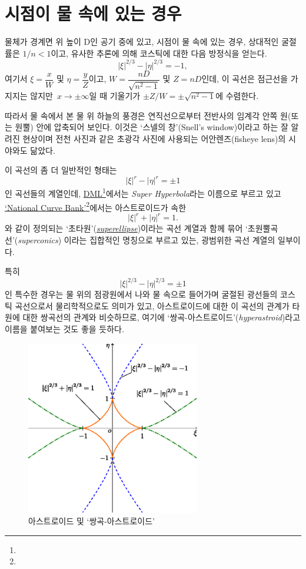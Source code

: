 \documentclass[twocolumn]{article}
\begin{document}
\section{시점이 물 속에 있는 경우}

물체가 경계면 위 높이 D인 공기 중에 있고, 
시점이 물 속에 있는 경우, 상대적인 굴절률은 $1/n < 1$이고, 
유사한 추론에 의해 코스틱에 대한 다음 방정식을 얻는다.
$$ \left| \xi \right|^{2/3} - \left| \eta \right|^{2/3} = -1, $$
여기서 $\xi = \dfrac{x}{W} $ 및 $\eta = \dfrac{y}{Z}$이고, 
$W = \dfrac{nD}{\sqrt{n^2-1}}$ 및 $Z = nD$인데,  이 곡선은 점근선을 가지지는 않지만 $x\rightarrow\pm\infty$일 때 기울기가 $\pm Z/W = \pm \sqrt{n^2-1}$에 수렴한다.

따라서 물 속에서 본 물 위 하늘의 풍경은
연직선으로부터 전반사의 임계각 안쪽 원(또는 원뿔) 안에 압축되어 보인다. 이것은 
`스넬의 창'(Snell's window)이라고 하는 잘 알려진 현상이며 전천 사진과 같은 초광각 
사진에 사용되는 어안렌즈(fisheye lens)의 시야와도 닮았다.

이 곡선의 좀 더 일반적인 형태는 
$$ \left| \xi \right|^{r} - \left| \eta \right|^{r} = \pm1 $$
인 곡선들의 계열인데, \href{http://dynamicmathematicslearning.com/super-ellipse.html}%
{DML}\footnote{}에서는 \emph{Super Hyperbola}라는 이름으로 부르고 있고 
\href{https://old.nationalcurvebank.org/superconicncb/superconicncb.htm}{`National Curve Bank'}\footnote{}에서는
아스트로이드가 속한 
$$ \left| \xi \right|^{r} + \left| \eta \right|^{r} = 1. $$
와 같이 정의되는 `초타원'(\href{https://mathworld.wolfram.com/Astroid.html}%
{\emph{superellipse}})이라는 곡선 계열과 함께 묶어
`초원뿔곡선'(\emph{superconics}) 이라는 집합적인 명칭으로 부르고 있는, 광범위한 곡선 계열의 일부이다.

특히
$$ \left| \xi \right|^{2/3} - \left| \eta \right|^{2/3} = \pm1 $$
인 특수한 경우는 물 위의 점광원에서 나와 물 속으로 들어가며 굴절된 광선들의 코스틱 곡선으로서 
물리학적으로도 의미가 있고, 아스트로이드에 대한 이 곡선의 관계가 타원에 대한 쌍곡선의 관계와 
비슷하므로, 여기에 `쌍곡-아스트로이드'(\emph{hyperastroid})라고 이름을 붙여보는 것도 좋을 듯하다. 

\begin{figure}
	\centering
	\includegraphics[width=3in]{figs/g254.eps}
	\caption{아스트로이드 및 `쌍곡-아스트로이드'}
	\label{fig:hyperastroid}
\end{figure}
\end{document}
